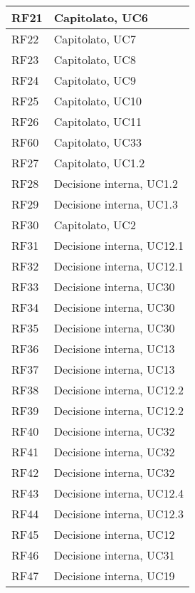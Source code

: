 \begin{center}
\begin{longtable}{|C{5cm}|C{5cm}|}
        \hline
        RF21 & Capitolato, UC6 \\
        \hline
        RF22 & Capitolato, UC7 \\
        \hline
        RF23 & Capitolato, UC8 \\
        \hline
        RF24 & Capitolato, UC9 \\
        \hline
        RF25 & Capitolato, UC10 \\
        \hline
        RF26 & Capitolato, UC11 \\
        \hline
        RF60 & Capitolato, UC33 \\
        \hline
        RF27 & Capitolato, UC1.2 \\
        \hline
        RF28 & Decisione interna, UC1.2 \\
        \hline
        RF29 & Decisione interna, UC1.3 \\
        \hline
        RF30 & Capitolato, UC2 \\
        \hline
        RF31 & Decisione interna, UC12.1 \\
        \hline
        RF32 & Decisione interna, UC12.1 \\
        \hline
        RF33 & Decisione interna, UC30 \\
        \hline
        RF34 & Decisione interna, UC30 \\
        \hline
        RF35 & Decisione interna, UC30 \\
        \hline
        RF36 & Decisione interna, UC13 \\
        \hline
        RF37 & Decisione interna, UC13 \\
        \hline
        RF38 & Decisione interna, UC12.2 \\
        \hline
        RF39 & Decisione interna, UC12.2 \\
        \hline
        RF40 & Decisione interna, UC32 \\
        \hline
        RF41 & Decisione interna, UC32 \\
        \hline
        RF42 & Decisione interna, UC32 \\
        \hline
        RF43 & Decisione interna, UC12.4 \\
        \hline
        RF44 & Decisione interna, UC12.3 \\
        \hline
        RF45 & Decisione interna, UC12 \\
        \hline
        RF46 & Decisione interna, UC31 \\
        \hline
        RF47 & Decisione interna, UC19 \\

\end{longtable}
\end{center}
